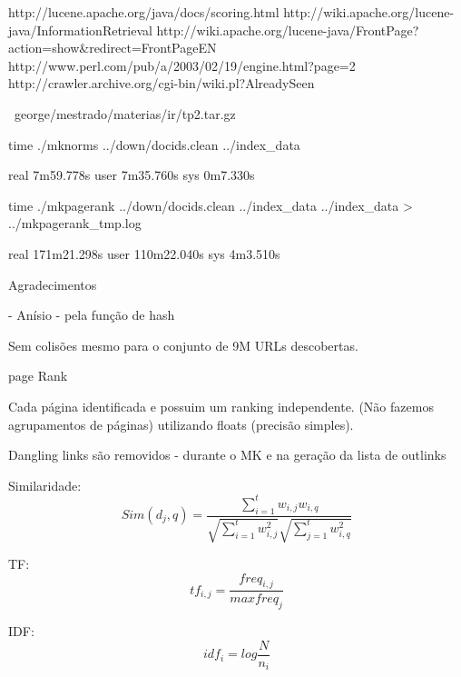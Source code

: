 http://lucene.apache.org/java/docs/scoring.html
http://wiki.apache.org/lucene-java/InformationRetrieval
http://wiki.apache.org/lucene-java/FrontPage?action=show&redirect=FrontPageEN
http://www.perl.com/pub/a/2003/02/19/engine.html?page=2
http://crawler.archive.org/cgi-bin/wiki.pl?AlreadySeen

 ~george/mestrado/materias/ir/tp2.tar.gz


time ./mknorms ../down/docids.clean ../index_data

real    7m59.778s
user    7m35.760s
sys     0m7.330s

time ./mkpagerank ../down/docids.clean ../index_data ../index_data > ../mkpagerank_tmp.log

real    171m21.298s
user    110m22.040s
sys     4m3.510s




Agradecimentos

 - Anísio - pela função de hash

Sem colisões mesmo para o conjunto de 9M URLs descobertas.


page Rank

Cada página identificada e possuim um ranking independente. (Não fazemos agrupamentos de páginas) utilizando floats (precisão simples).

Dangling links são removidos - durante o MK e na geração da lista de outlinks


Similaridade:
\begin{equation}
Sim(d_{j},q) = \frac{\sum_{i = 1}^{t}w_{i,j} w_{i,q}}{\sqrt{\sum_{i =
1}^{t}w_{i,j}^{2}} \sqrt{\sum_{j = 1}^{t}w_{i,q}^{2}}}
\label{eq:sim}
\end{equation}

TF:
\begin{equation}
tf_{i,j} = \frac{freq_{i,j}}{max freq_{j}}
\label{eq:tf}
\end{equation}


IDF:
\begin{equation}
idf_{i} = log\frac{N}{n_{i}}
\label{eq:idf}
\end{equation}
